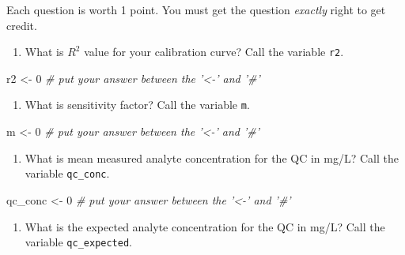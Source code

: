 \documentclass[]{tufte-book}
\newenvironment{Shaded}{}{}
\newcommand{\CommentTok}[1]{\textcolor[rgb]{0.38,0.63,0.69}{\textit{#1}}}
\newcommand{\DecValTok}[1]{\textcolor[rgb]{0.25,0.63,0.44}{#1}}
\newcommand{\NormalTok}[1]{#1}
\newcommand{\StringTok}[1]{\textcolor[rgb]{0.25,0.44,0.63}{#1}}
\providecommand{\tightlist}{%
  \setlength{\itemsep}{0pt}\setlength{\parskip}{0pt}}
\begin{document}
Each question is worth 1 point. You must get the question \emph{exactly} right to get credit.

\begin{enumerate}
\def\labelenumi{\arabic{enumi}.}
\tightlist
\item
  What is \(R^2\) value for your calibration curve? Call the variable \texttt{r2}.
\end{enumerate}

\begin{Shaded}
\begin{Highlighting}[]
\NormalTok{r2 <-}\StringTok{ }\DecValTok{0}     \CommentTok{# put your answer between the '<-' and '#'}
\end{Highlighting}
\end{Shaded}

\begin{enumerate}
\def\labelenumi{\arabic{enumi}.}
\setcounter{enumi}{1}
\tightlist
\item
  What is sensitivity factor? Call the variable \texttt{m}.
\end{enumerate}

\begin{Shaded}
\begin{Highlighting}[]
\NormalTok{m <-}\StringTok{ }\DecValTok{0}     \CommentTok{# put your answer between the '<-' and '#'}
\end{Highlighting}
\end{Shaded}

\begin{enumerate}
\def\labelenumi{\arabic{enumi}.}
\setcounter{enumi}{2}
\tightlist
\item
  What is mean measured analyte concentration for the QC in mg/L? Call the variable \texttt{qc\_conc}.
\end{enumerate}

\begin{Shaded}
\begin{Highlighting}[]
\NormalTok{qc_conc <-}\StringTok{ }\DecValTok{0}     \CommentTok{# put your answer between the '<-' and '#'}
\end{Highlighting}
\end{Shaded}

\begin{enumerate}
\def\labelenumi{\arabic{enumi}.}
\setcounter{enumi}{3}
\tightlist
\item
  What is the expected analyte concentration for the QC in mg/L? Call the variable \texttt{qc\_expected}.
\end{enumerate}
\end{document}
